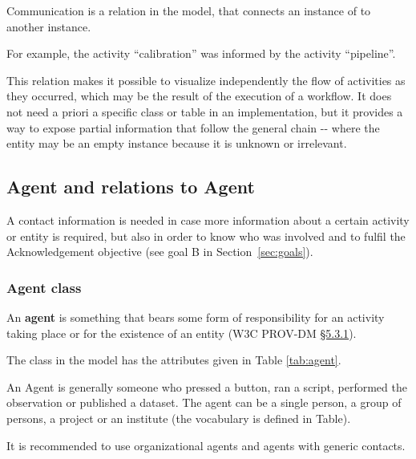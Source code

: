 Communication is a relation  in the model, that connects an instance of  to another instance.

For example, the activity ``calibration'' was informed by the activity ``pipeline''.

This relation makes it possible to visualize independently the flow of activities as they occurred, which may be the result of the execution of a workflow. It does not need a priori a specific class or table in an implementation, but it provides a way to expose partial information that follow the general chain -- where the entity may be an empty instance because it is unknown or irrelevant.


\subsection{Agent and relations to Agent}
\label{sec:agent+relations}

A contact information is needed in case more information about a certain activity or entity is required, but also in order to know who was involved and to fulfil the Acknowledgement objective (see goal B in Section~\ref{sec:goals}).


\subsubsection{Agent class}
\label{sec:agent}

An \textbf{agent} is something that bears some form of responsibility for an activity taking place or for the existence of an entity (W3C PROV-DM \href{https://www.w3.org/TR/prov-dm/#term-agent}{\S5.3.1}).

The  class in the model has the attributes given in Table \ref{tab:agent}. 

An Agent is generally someone who pressed a button, ran a script, performed the observation or published a dataset. The agent can be a single person, a group of persons, a project or an institute (the vocabulary is defined in Table).

It is recommended to use organizational agents and agents with generic contacts.


